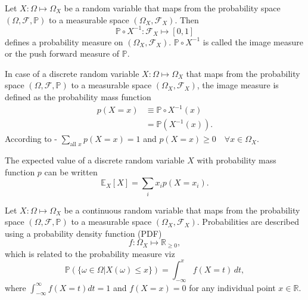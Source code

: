 \begin{definition}
	\label{def:image_measure}
	Let $X: \Omega \mapsto \Omega_X$ be a random variable that maps from the probability space $(\Omega, \mathcal{F}, \mathbb{P})$ to a measurable space $(\Omega_X, \mathcal{F}_X)$. Then~\cite{drewitz2019introduction}
	\begin{equation}
		\mathbb{P}\circ X^{-1}: \mathcal{F}_X\mapsto [0,1]
	\end{equation}
	defines a probability measure on $(\Omega_X, \mathcal{F}_X)$. $\mathbb{P}\circ X^{-1}$ is called the image measure or the push forward measure of $\mathbb{P}$.
\end{definition}

\begin{definition}
	\label{def:pmf}
	In case of a discrete random variable $X: \Omega \mapsto \Omega_X$ that maps from the probability space $(\Omega, \mathcal{F}, \mathbb{P})$ to a measurable space $(\Omega_X, \mathcal{F}_X)$, the image measure is defined as the probability mass function
	\begin{equation}
		\begin{split}
			p( X = x) &\equiv  \mathbb{P}\circ X^{-1}(x)\\
			& = \mathbb{P}(X^{-1}(x)).
		\end{split}
		\label{eq:disc}
	\end{equation}
	According to - $\sum_{\text{all }x} p(X=x) = 1$ and $p(X=x) \geq 0 \quad \forall x\in \Omega_X$. 
\end{definition}

\begin{theorem}
	The expected value of a discrete random variable $X$ with probability mass function $p$ can be written
	\begin{equation}
		\mathbb{E}_X[X]=\sum_{i}x_ip(X = x_i).
	\end{equation}
\end{theorem}

\begin{definition}
	\label{def:pdf}
	Let $X: \Omega \mapsto \Omega_X$ be a continuous random variable that maps from the probability space $(\Omega, \mathcal{F}, \mathbb{P})$ to a measurable space $(\Omega_X, \mathcal{F}_X)$. Probabilities are described using a probability density function (PDF) 
	 \begin{equation}
	 	f: \Omega_X \mapsto \mathbb{R}_{\geq 0},
	 \end{equation}
	 which is related to the probability measure viz
	\begin{equation}
		\mathbb{P}(\{\omega \in \Omega | X(\omega) \leq x\}) = \int_{-\infty}^x f(X = t) \, dt,
		\label{eq:cont}
	\end{equation}
	 where $\int_{-\infty}^\infty f(X=t) dt = 1$ and $f(X=x)=0$ for any individual point $x \in \mathbb{R}$.
\end{definition}

